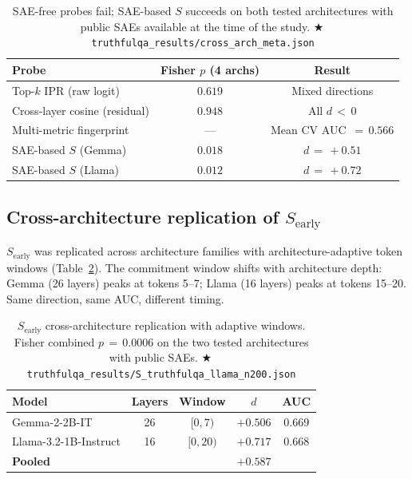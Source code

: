 \documentclass[11pt,letterpaper]{article}
\newcommand{\repro}[1]{%
  \textcolor{fathomgreen}{\footnotesize$\bigstar$\,\texttt{#1}}}
\begin{document}
\begin{table}[h]
\centering
\small
\begin{tabular}{lcc}
\toprule
Probe & Fisher $p$ (4 archs) & Result \\
\midrule
Top-$k$ IPR (raw logit)       & $0.619$ & Mixed directions \\
Cross-layer cosine (residual) & $0.948$ & All $d\,<\,0$ \\
Multi-metric fingerprint      & ---     & Mean CV AUC $\,=\,0.566$ \\
\midrule
SAE-based $S$ (Gemma)         & $\mathbf{0.018}$ & $d\,=\,+0.51$ \\
SAE-based $S$ (Llama)         & $\mathbf{0.012}$ & $d\,=\,+0.72$ \\
\bottomrule
\end{tabular}
\caption{SAE-free probes fail; SAE-based $S$ succeeds on both tested
architectures with public SAEs available at the time of the study.
\repro{truthfulqa\_results/cross\_arch\_meta.json}}
\label{tab:saefree}
\end{table}

\subsection{Cross-architecture replication of $S_{\text{early}}$}

$S_{\text{early}}$ was replicated across architecture families with
architecture-adaptive token windows (Table~\ref{tab:crossarch}). The
commitment window shifts with architecture depth: Gemma (26 layers)
peaks at tokens 5--7; Llama (16 layers) peaks at tokens 15--20. Same
direction, same AUC, different timing.

\begin{table}[h]
\centering
\small
\begin{tabular}{lcccc}
\toprule
Model & Layers & Window & $d$ & AUC \\
\midrule
Gemma-2-2B-IT         & 26 & $[0,7)$  & $+0.506$ & $0.669$ \\
Llama-3.2-1B-Instruct & 16 & $[0,20)$ & $+0.717$ & $0.668$ \\
\midrule
\textbf{Pooled}       &    &          & $\mathbf{+0.587}$ & \\
\bottomrule
\end{tabular}
\caption{$S_{\text{early}}$ cross-architecture replication with adaptive
windows. Fisher combined $p\,=\,0.0006$ on the two tested architectures
with public SAEs.
\repro{truthfulqa\_results/S\_truthfulqa\_llama\_n200.json}}
\label{tab:crossarch}
\end{table}
\end{document}
